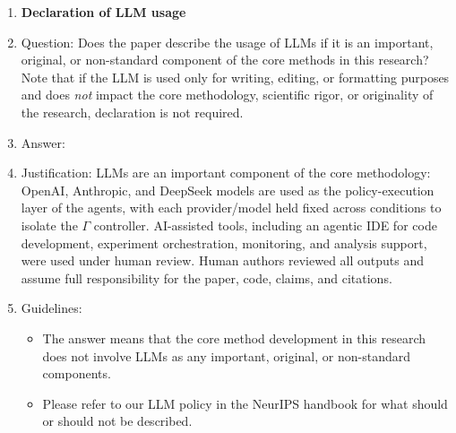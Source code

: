 \begin{enumerate}
\item {\bf Declaration of LLM usage}
    \item[] Question: Does the paper describe the usage of LLMs if it is an important, original, or non-standard component of the core methods in this research? Note that if the LLM is used only for writing, editing, or formatting purposes and does \emph{not} impact the core methodology, scientific rigor, or originality of the research, declaration is not required.
    \item[] Answer: \answerYes{}
    \item[] Justification: LLMs are an important component of the core methodology: OpenAI, Anthropic, and DeepSeek models are used as the policy-execution layer of the agents, with each provider/model held fixed across conditions to isolate the $\Gamma$ controller. AI-assisted tools, including an agentic IDE for code development, experiment orchestration, monitoring, and analysis support, were used under human review. Human authors reviewed all outputs and assume full responsibility for the paper, code, claims, and citations.
    \item[] Guidelines:
    \begin{itemize}
        \item The answer \answerNA{} means that the core method development in this research does not involve LLMs as any important, original, or non-standard components.
        \item Please refer to our LLM policy in the NeurIPS handbook for what should or should not be described.
    \end{itemize}

\end{enumerate}